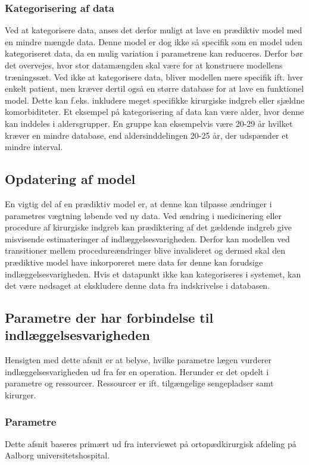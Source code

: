 \subsubsection{Kategorisering af data}
Ved at kategorisere data, anses det derfor muligt at lave en prædiktiv model med en mindre mængde data. Denne model er dog ikke så specifik som en model uden kategoriseret data, da en mulig variation i parametrene kan reduceres.\cite{Rowan2007} 
Derfor bør det overvejes, hvor stor datamængden skal være for at konstruere modellens træningssæt. Ved ikke at kategorisere data, bliver modellen mere specifik ift. hver enkelt patient, men kræver dertil også en større database for at lave en funktionel model. Dette kan f.eks. inkludere meget specifikke kirurgiske indgreb eller sjældne komorbiditeter. 
Et eksempel på kategorisering af data kan være alder, hvor denne kan inddeles i aldersgrupper. En gruppe kan eksempelvis være 20-29 år hvilket kræver en mindre database, end aldersinddelingen 20-25 år, der udspænder et mindre interval.\cite{Rowan2007}  

\subsection{Opdatering af model}
En vigtig del af en prædiktiv model er, at denne kan tilpasse ændringer i parametres vægtning løbende ved ny data.\cite{Kuhn2013} Ved ændring i medicinering eller procedure af kirurgiske indgreb kan prædiktering af det gældende indgreb give misvisende estimateringer af indlæggelsesvarigheden. Derfor kan modellen ved transitioner mellem procedureændringer blive invalideret og dermed skal den prædiktive model have inkorporeret mere data før denne kan forudsige indlæggelsesvarigheden. 
Hvis et datapunkt ikke kan kategoriseres i systemet, kan det være nødsaget at ekskludere denne data fra indskrivelse i databasen.

\subsection{Parametre der har forbindelse til indlæggelsesvarigheden}
Hensigten med dette afsnit er at belyse, hvilke parametre lægen vurderer indlæggelsesvarigheden ud fra før en operation. Herunder er det opdelt i parametre og ressourcer. Ressourcer er ift. tilgængelige sengepladser samt kirurger. 


\subsubsection{Parametre}
Dette afsnit baseres primært ud fra interviewet på ortopædkirurgisk afdeling på Aalborg universitetshospital. 


